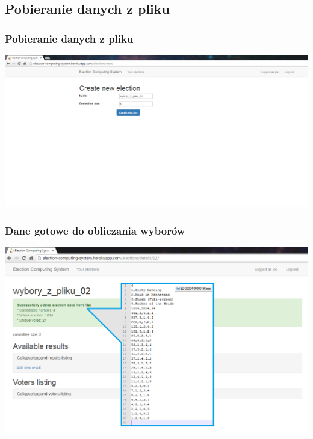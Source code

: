 \documentclass{beamer}
\begin{document}
\subsection{Pobieranie danych z pliku}
\begin{frame}
\frametitle{Pobieranie danych z pliku}
\includegraphics[width=0.8\paperwidth]{screenshots/05_file_elections_01.png}
\end{frame}


\begin{frame}
\frametitle{Dane gotowe do obliczania wyborów}
\includegraphics[width=0.8\paperwidth]{screenshots/10_soc_file_loaded_other.png}
\end{frame}

\end{document}
